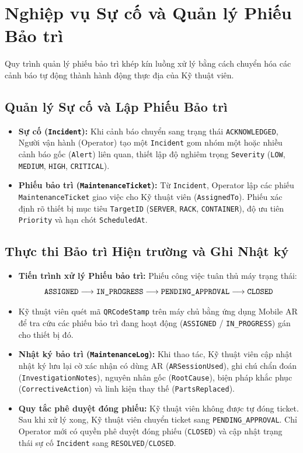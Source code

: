 \section{Nghiệp vụ Sự cố và Quản lý Phiếu Bảo trì}
Quy trình quản lý phiếu bảo trì khép kín luồng xử lý bằng cách chuyển hóa các cảnh báo tự động thành hành động thực địa của Kỹ thuật viên.

\subsection{Quản lý Sự cố và Lập Phiếu Bảo trì}
\begin{itemize}[leftmargin=2em]
    \item \textbf{Sự cố (\texttt{Incident}):} Khi cảnh báo chuyển sang trạng thái \texttt{ACKNOWLEDGED}, Người vận hành (Operator) tạo một \texttt{Incident} gom nhóm một hoặc nhiều cảnh báo gốc (\texttt{Alert}) liên quan, thiết lập độ nghiêm trọng \texttt{Severity} (\texttt{LOW}, \texttt{MEDIUM}, \texttt{HIGH}, \texttt{CRITICAL}).
    \item \textbf{Phiếu bảo trì (\texttt{MaintenanceTicket}):} Từ \texttt{Incident}, Operator lập các phiếu \texttt{MaintenanceTicket} giao việc cho Kỹ thuật viên (\texttt{AssignedTo}). Phiếu xác định rõ thiết bị mục tiêu \texttt{TargetID} (\texttt{SERVER}, \texttt{RACK}, \texttt{CONTAINER}), độ ưu tiên \texttt{Priority} và hạn chót \texttt{ScheduledAt}.
\end{itemize}

\subsection{Thực thi Bảo trì Hiện trường và Ghi Nhật ký}
\begin{itemize}[leftmargin=2em]
    \item \textbf{Tiến trình xử lý Phiếu bảo trì:} Phiếu công việc tuân thủ máy trạng thái:
    \begin{equation*}
    \text{\texttt{ASSIGNED}} \longrightarrow \text{\texttt{IN\_PROGRESS}} \longrightarrow \text{\texttt{PENDING\_APPROVAL}} \longrightarrow \text{\texttt{CLOSED}}
    \end{equation*}
    \item Kỹ thuật viên quét mã \texttt{QRCodeStamp} trên máy chủ bằng ứng dụng Mobile AR để tra cứu các phiếu bảo trì đang hoạt động (\texttt{ASSIGNED} / \texttt{IN\_PROGRESS}) gán cho thiết bị đó.
    \item \textbf{Nhật ký bảo trì (\texttt{MaintenanceLog}):} Khi thao tác, Kỹ thuật viên cập nhật nhật ký lưu lại cờ xác nhận có dùng AR (\texttt{ARSessionUsed}), ghi chú chẩn đoán (\texttt{InvestigationNotes}), nguyên nhân gốc (\texttt{RootCause}), biện pháp khắc phục (\texttt{CorrectiveAction}) và linh kiện thay thế (\texttt{PartsReplaced}).
    \item \textbf{Quy tắc phê duyệt đóng phiếu:} Kỹ thuật viên không được tự đóng ticket. Sau khi xử lý xong, Kỹ thuật viên chuyển ticket sang \texttt{PENDING\_APPROVAL}. Chỉ Operator mới có quyền phê duyệt đóng phiếu (\texttt{CLOSED}) và cập nhật trạng thái sự cố \texttt{Incident} sang \texttt{RESOLVED}/\texttt{CLOSED}.
\end{itemize}
